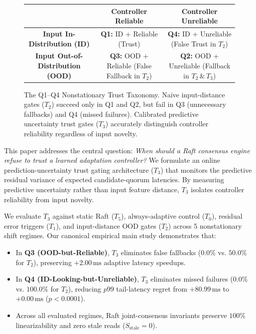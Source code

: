 \begin{figure}[t]
\centering
\begin{tabular}{|c|c|c|}
\hline
& \textbf{Controller Reliable} & \textbf{Controller Unreliable} \\ \hline
\textbf{Input In-Distribution (ID)} & \textbf{Q1:} ID + Reliable (Trust) & \textbf{Q4:} ID + Unreliable (False Trust in $T_2$) \\ \hline
\textbf{Input Out-of-Distribution (OOD)} & \textbf{Q3:} OOD + Reliable (False Fallback in $T_2$) & \textbf{Q2:} OOD + Unreliable (Fallback in $T_2\,\&\,T_3$) \\ \hline
\end{tabular}
\caption{The Q1--Q4 Nonstationary Trust Taxonomy. Naive input-distance gates ($T_2$) succeed only in Q1 and Q2, but fail in Q3 (unnecessary fallbacks) and Q4 (missed failures). Calibrated predictive uncertainty trust gates ($T_3$) accurately distinguish controller reliability regardless of input novelty.}
\label{fig:taxonomy}
\end{figure}

This paper addresses the central question: \emph{When should a Raft consensus engine refuse to trust a learned adaptation controller?} We formulate an online prediction-uncertainty trust gating architecture ($T_3$) that monitors the predictive residual variance of expected candidate-quorum latencies. By measuring predictive uncertainty rather than input feature distance, $T_3$ isolates controller reliability from input novelty.

We evaluate $T_3$ against static Raft ($T_5$), always-adaptive control ($T_0$), residual error triggers ($T_1$), and input-distance OOD gates ($T_2$) across 5 nonstationary shift regimes. Our canonical empirical main study demonstrates that:
\begin{itemize}
    \item In \textbf{Q3 (OOD-but-Reliable)}, $T_3$ eliminates false fallbacks ($0.0\%$ vs. $50.0\%$ for $T_2$), preserving $+2.00\,\text{ms}$ adaptive latency speedups.
    \item In \textbf{Q4 (ID-Looking-but-Unreliable)}, $T_3$ eliminates missed failures ($0.0\%$ vs. $100.0\%$ for $T_2$), reducing $p99$ tail-latency regret from $+80.99\,\text{ms}$ to $+0.00\,\text{ms}$ ($p < 0.0001$).
    \item Across all evaluated regimes, Raft joint-consensus invariants preserve $100\%$ linearizability and zero stale reads ($S_{\text{stale}}=0$).
\end{itemize}
